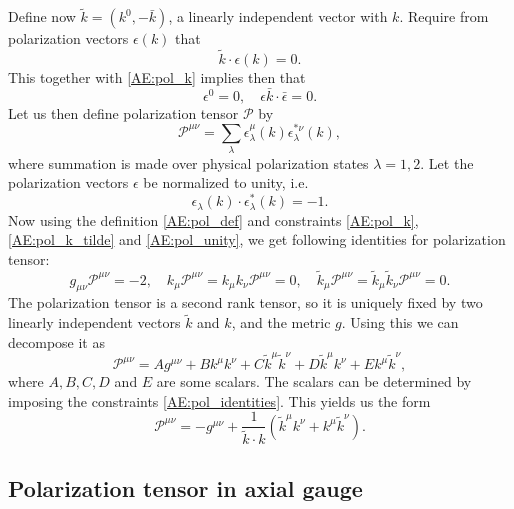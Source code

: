 \documentclass[a4paper, twoside, english, 12pt]{article}
\begin{document}
Define now $\tilde{k}=(k^0,-\bar{k})$, a linearly independent vector with $k$. Require from polarization vectors $\epsilon(k)$ that 
\begin{equation}\label{AE:pol_k_tilde}
	\tilde{k}\cdot\epsilon(k) =0.
\end{equation}
This together with \eqref{AE:pol_k} implies then that
\begin{equation}\label{AE:pol_self}
	\epsilon^0 = 0, \quad \epsilon \bar{k}\cdot \bar{\epsilon}=0.
\end{equation}
Let us then define polarization tensor $\mathcal{P}$ by
\begin{equation}\label{AE:pol_def}
\mathcal{P}^{\mu\nu} = \sum\limits_{\lambda} \epsilon^\mu_\lambda(k)\epsilon^{*\nu}_\lambda(k),
\end{equation}
where summation is made over physical polarization states $\lambda=1,2$. Let the polarization vectors $\epsilon$ be normalized to unity, i.e.
\begin{equation}\label{AE:pol_unity}
\epsilon_\lambda(k)\cdot \epsilon^{*}_\lambda(k)=-1.
\end{equation}
Now using the definition \eqref{AE:pol_def} and constraints \eqref{AE:pol_k}, \eqref{AE:pol_k_tilde} and \eqref{AE:pol_unity}, we get following identities for polarization tensor:
\begin{equation}\label{AE:pol_identities}
g_{\mu\nu}\mathcal{P}^{\mu\nu}=-2, \quad k_{\mu}\mathcal{P}^{\mu\nu}=k_{\mu}k_{\nu}\mathcal{P}^{\mu\nu}= 0 , \quad \tilde{k}_{\mu}\mathcal{P}^{\mu\nu}=\tilde{k}_{\mu}\tilde{k}_{\nu}\mathcal{P}^{\mu\nu}= 0 .
\end{equation}
The polarization tensor is a second rank tensor, so it is uniquely fixed by two linearly independent vectors $\tilde{k}$ and $k$, and the metric $g$. Using this we can decompose it as
\begin{equation}
\mathcal{P}^{\mu\nu} = Ag^{\mu\nu} + Bk^{\mu}k^{\nu}+ C\tilde{k}^{\mu}\tilde{k}^{\nu} + D\tilde{k}^{\mu}k^{\nu} + Ek^{\mu}\tilde{k}^{\nu},
\end{equation}
where $A,B,C,D$ and $E$ are some scalars. The scalars can be determined by imposing the constraints \eqref{AE:pol_identities}. This yields us the form
\begin{equation}
\mathcal{P}^{\mu\nu} = -g^{\mu\nu} + \frac{1}{\tilde{k}\cdot k}\left(\tilde{k}^{\mu}k^{\nu} + k^{\mu}\tilde{k}^{\nu}\right).
\end{equation}


\subsection{Polarization tensor in axial gauge}\label{AS:axial_polarization_tensor}
\end{document}
